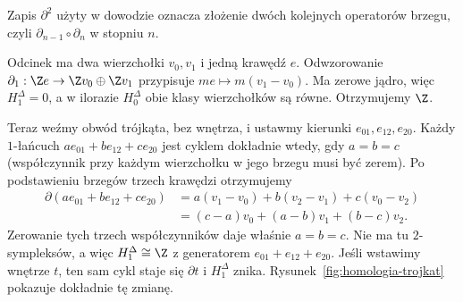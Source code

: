 Zapis $\partial^2$ użyty w dowodzie oznacza złożenie dwóch kolejnych
operatorów brzegu, czyli $\partial_{n-1}\circ\partial_n$ w stopniu $n$.

\begin{przyklad}
\label{prz:homologia-odcinek-okrag}
Odcinek ma dwa wierzchołki $v_0,v_1$
i jedną krawędź $e$. Odwzorowanie
$\partial_1:\Z e\to\Z v_0\oplus\Z v_1$
przypisuje $me\mapsto m(v_1-v_0)$.
Ma zerowe jądro, więc $H_1^\Delta=0$,
a w ilorazie $H_0^\Delta$ obie klasy
wierzchołków są równe. Otrzymujemy $\Z$.

Teraz weźmy obwód trójkąta, bez wnętrza,
i ustawmy kierunki $e_{01},e_{12},e_{20}$.
Każdy $1$-łańcuch
$ae_{01}+be_{12}+ce_{20}$ jest cyklem
dokładnie wtedy, gdy $a=b=c$
(współczynnik przy każdym wierzchołku
w jego brzegu musi być zerem).
Po podstawieniu brzegów trzech krawędzi otrzymujemy
\[
 \begin{aligned}
 \partial(ae_{01}+be_{12}+ce_{20})
 &=a(v_1-v_0)+b(v_2-v_1)+c(v_0-v_2)\\
 &=(c-a)v_0+(a-b)v_1+(b-c)v_2.
 \end{aligned}
\]
Zerowanie tych trzech współczynników daje właśnie $a=b=c$.
Nie ma tu $2$-sympleksów, a więc
$H_1^\Delta\cong\Z$ z generatorem
$e_{01}+e_{12}+e_{20}$.
Jeśli wstawimy wnętrze $t$, ten sam
cykl staje się $\partial t$ i
$H_1^\Delta$ znika. Rysunek~\ref{fig:homologia-trojkat}
pokazuje dokładnie tę zmianę.
\end{przyklad}

